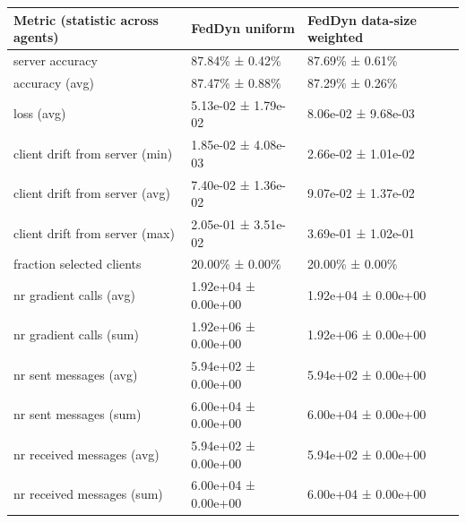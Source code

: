 \begin{tabular}{lll}
\hline
 Metric (statistic across agents)   & FedDyn uniform      & FedDyn data-size weighted   \\
\hline
 server accuracy                    & 87.84\% ± 0.42\%      & 87.69\% ± 0.61\%              \\
 accuracy (avg)                     & 87.47\% ± 0.88\%      & 87.29\% ± 0.26\%              \\
 loss (avg)                         & 5.13e-02 ± 1.79e-02 & 8.06e-02 ± 9.68e-03         \\
 client drift from server (min)     & 1.85e-02 ± 4.08e-03 & 2.66e-02 ± 1.01e-02         \\
 client drift from server (avg)     & 7.40e-02 ± 1.36e-02 & 9.07e-02 ± 1.37e-02         \\
 client drift from server (max)     & 2.05e-01 ± 3.51e-02 & 3.69e-01 ± 1.02e-01         \\
 fraction selected clients          & 20.00\% ± 0.00\%      & 20.00\% ± 0.00\%              \\
 nr gradient calls (avg)            & 1.92e+04 ± 0.00e+00 & 1.92e+04 ± 0.00e+00         \\
 nr gradient calls (sum)            & 1.92e+06 ± 0.00e+00 & 1.92e+06 ± 0.00e+00         \\
 nr sent messages (avg)             & 5.94e+02 ± 0.00e+00 & 5.94e+02 ± 0.00e+00         \\
 nr sent messages (sum)             & 6.00e+04 ± 0.00e+00 & 6.00e+04 ± 0.00e+00         \\
 nr received messages (avg)         & 5.94e+02 ± 0.00e+00 & 5.94e+02 ± 0.00e+00         \\
 nr received messages (sum)         & 6.00e+04 ± 0.00e+00 & 6.00e+04 ± 0.00e+00         \\
\hline
\end{tabular}